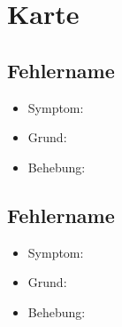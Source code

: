 \documentclass[qualitaetssicherung.tex]{subfiles}
\begin{document}
\section{Karte}

	\subsection{Fehlername}
		\begin{itemize}
			\item
			Symptom:
			\item
			Grund:
			\item
			Behebung:
		\end{itemize}
		
	\subsection{Fehlername}
		\begin{itemize}
			\item
			Symptom:
			\item
			Grund:
			\item
			Behebung:
		\end{itemize}
		
\end{document}
